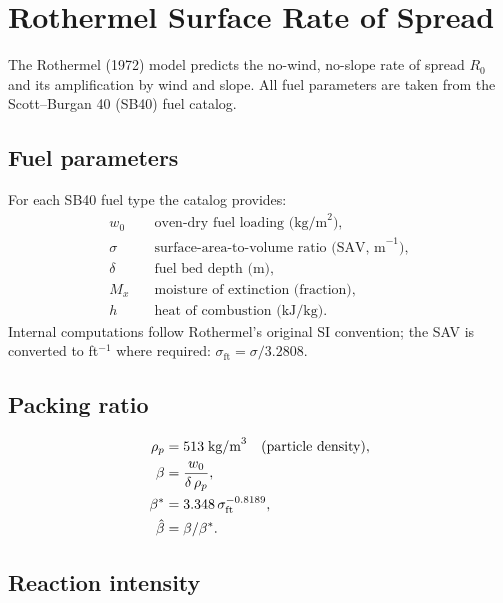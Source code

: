 \documentclass[11pt,twocolumn]{article}
\begin{document}
\section{Rothermel Surface Rate of Spread}
\label{sec:rothermel}

The Rothermel (1972) model predicts the no-wind, no-slope rate of
spread $R_0$ and its amplification by wind and slope.  All fuel
parameters are taken from the Scott--Burgan 40 (SB40) fuel catalog.

\subsection{Fuel parameters}

For each SB40 fuel type the catalog provides:
\begin{align*}
  w_0 &\quad \text{oven-dry fuel loading (kg/m}^2\text{)},\\
  \sigma &\quad \text{surface-area-to-volume ratio (SAV, m}^{-1}\text{)},\\
  \delta &\quad \text{fuel bed depth (m)},\\
  M_x &\quad \text{moisture of extinction (fraction)},\\
  h &\quad \text{heat of combustion (kJ/kg)}.
\end{align*}
Internal computations follow Rothermel's original SI convention;
the SAV is converted to ft$^{-1}$ where required:
$\sigma_{\mathrm{ft}} = \sigma / 3.2808$.

\subsection{Packing ratio}

\begin{align}
  \rho_p &= 513\;\text{kg/m}^3 \quad\text{(particle density)},\notag\\
  \beta &= \frac{w_0}{\delta\,\rho_p},\label{eq:beta}\\
  \beta^* &= 3.348\,\sigma_{\mathrm{ft}}^{-0.8189},\label{eq:betaop}\\
  \hat{\beta} &= \beta / \beta^*.\label{eq:betaratio}
\end{align}

\subsection{Reaction intensity}
\end{document}
